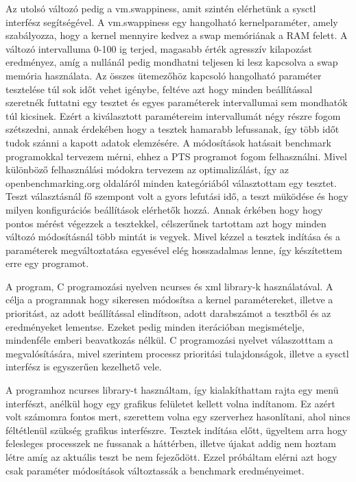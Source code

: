 Az utolsó változó pedig a vm.swappiness, amit szintén elérhetünk a sysctl interfész segítségével. 
A vm.swappiness egy hangolható kernelparaméter, amely szabályozza, hogy a kernel mennyire kedvez a swap memóriának a RAM felett. A változó intervalluma 0-100 ig terjed, magasabb érték agresszív kilapozást eredményez, amíg a nullánál pedig mondhatni teljesen ki lesz kapcsolva a swap memória használata. Az összes ütemezőhöz kapcsoló hangolható paraméter tesztelése túl sok időt vehet igénybe, feltéve azt hogy minden beállítással szeretnék futtatni egy tesztet és egyes paraméterek intervallumai sem mondhatók túl kicsinek. Ezért a kiválasztott paramétereim intervallumát négy részre fogom szétszedni, annak érdekében hogy a tesztek hamarabb lefussanak, így több időt tudok szánni a kapott adatok elemzésére.
A módosítások hatásait benchmark programokkal tervezem mérni, ehhez a PTS programot fogom felhasználni. Mivel különböző felhasználási módokra tervezem az optimalizálást, így az openbenchmarking.org oldaláról minden kategóriából választottam egy tesztet. 
Teszt választásnál fő szempont volt a gyors lefutási idő, a teszt müködése és hogy milyen konfigurációs beállítások elérhetők hozzá. Annak érkében hogy hogy pontos mérést végezzek a tesztekkel, célszerűnek tartottam azt hogy minden változó módosításnál több mintát is vegyek.
Mivel kézzel a tesztek indítása és a paraméterek megváltoztatása egyesével elég hosszadalmas lenne, így készítettem erre egy programot.


A program, C programozási nyelven ncurses és xml library-k használatával.
A célja a programnak hogy sikeresen módosítsa a kernel paramétereket, illetve a prioritást, az adott beállítással elindítson, adott darabszámot a tesztből és az eredményeket lementse. Ezeket pedig minden iterációban megismételje, mindenféle emberi beavatkozás nélkül.
C programozási nyelvet válaszotttam a megvalósítására, mivel szerintem  processz prioritási tulajdonságok, illetve a sysctl interfész is egyszerűen kezelhető vele.

A programhoz ncurses library-t használtam, így kialakíthattam rajta egy menü interfészt, anélkül hogy egy grafikus felületet kellett volna indítanom. Ez azért volt számomra fontos mert, szerettem volna egy szerverhez hasonlítani, ahol nincs féltétlenül szükség grafikus interfészre. Tesztek indítása előtt, ügyeltem arra hogy felesleges processzek ne fussanak a háttérben, illetve újakat addig nem hoztam létre amíg az aktuális teszt be nem fejeződött. Ezzel próbáltam elérni azt hogy csak paraméter módosítások változtassák a benchmark eredményeimet.

